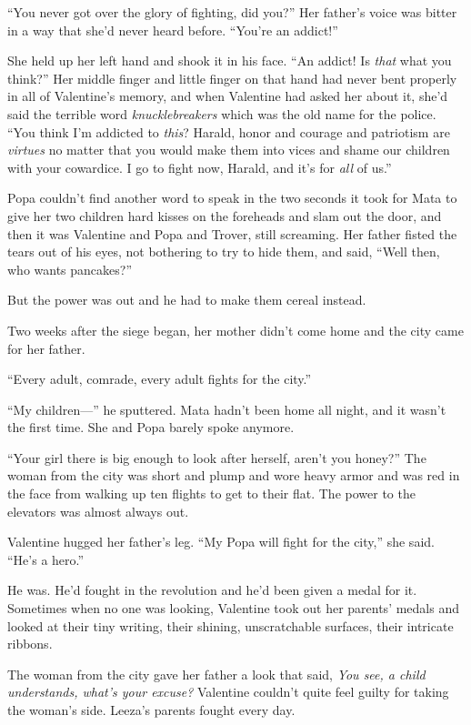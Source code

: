“You never got over the glory of fighting, did you?” Her father’s
voice was bitter in a way that she’d never heard before. “You’re an
addict!”

She held up her left hand and shook it in his face. “An addict! Is
\emph{that} what you think?” Her middle finger and little finger on
that hand had never bent properly in all of Va\-len\-tine’s memory, and
when Valentine had asked her about it, she’d said the terrible word
\emph{knucklebreakers} which was the old name for the police. “You
think I’m addicted to \emph{this}? Harald, honor and courage and
patriotism are \emph{virtues} no matter that you would make them
into vices and shame our children with your cowardice. I go to
fight now, Harald, and it’s for \emph{all} of us.”

Popa couldn’t find another word to speak in the two seconds it took
for Mata to give her two children hard kisses on the foreheads and
slam out the door, and then it was Valentine and Popa and Trover,
still screaming. Her father fisted the tears out of his eyes, not
bothering to try to hide them, and said, “Well then, who wants
pancakes?”

But the power was out and he had to make them cereal instead.

\tb

Two weeks after the siege began, her mother didn’t come home and
the city came for her father.

“Every adult, comrade, every adult fights for the city.”

“My children---” he sputtered. Mata hadn’t been home all night, and
it wasn’t the first time. She and Popa barely spoke anymore.

“Your girl there is big enough to look after herself, aren’t you
honey?” The woman from the city was short and plump and wore heavy
armor and was red in the face from walking up ten flights to get to
their flat. The power to the elevators was almost always out.

Valentine hugged her father’s leg. “My Popa will fight for the
city,” she said. “He’s a hero.”

He was. He’d fought in the revolution and he’d been given a medal
for it. Sometimes when no one was looking, Valentine took out her
parents’ medals and looked at their tiny writing, their shining,
unscratchable surfaces, their intricate ribbons.

The woman from the city gave her father a look that said,
\emph{You see, a child understands, what’s your excuse?} Valentine
couldn’t quite feel guilty for taking the woman’s side. Leeza’s
parents fought every day.

